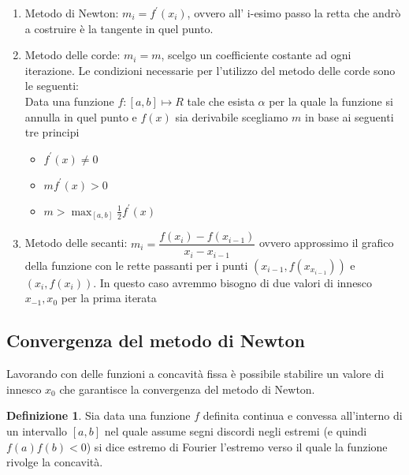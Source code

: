 \documentclass[12pt, a4paper]{book}
\theoremstyle{definition}
\newtheorem{defn}{Definizione}[section]
\begin{document}
\begin{flushleft}
\begin{enumerate}
	\item Metodo di Newton: $m_{i} = f^{'}(x_{i})$,  ovvero all' i-esimo passo la retta che andrò a costruire è la tangente in quel punto. 
	\item Metodo delle corde: $m_{i} = m$,  scelgo un coefficiente costante ad ogni iterazione.  Le condizioni necessarie per l'utilizzo del metodo delle corde sono le seguenti: \\
	Data una funzione $f:[a,b] \mapsto R$ tale che esista $\alpha$ per la quale la funzione si annulla in quel punto e $f(x)$ sia derivabile scegliamo $m$ in base ai seguenti tre principi
	\begin{itemize}
		\item $f^{'}(x) \neq 0$
		\item $mf^{'}(x) > 0$
		\item $m > \max_{[a,b]} \frac{1}{2}f^{'}(x) $
	\end{itemize}
	\item Metodo delle secanti:  $m_{i} = \dfrac{f(x_{i}) - f(x_{i - 1})}{x_{i} - x_{i - 1}}$ ovvero approssimo il grafico della funzione con le rette passanti per i punti $(x_{i-1}, f(x_{x_{i-1}}))$ e $(x_{i}, f(x_{i}))$. In questo caso avremmo bisogno di due valori di innesco $x_{-1}, x_{0}$ per la prima iterata 
\end{enumerate}

\subsection{Convergenza del metodo di Newton}
Lavorando con delle funzioni a concavità fissa è possibile stabilire un valore di innesco $x_{0}$ che garantisce la convergenza del metodo di Newton.
\begin{defn}
Sia data una funzione $f$ definita continua e convessa all'interno di un intervallo $[a,b]$ nel quale assume segni discordi negli estremi (e quindi $f(a)f(b)<0$) si dice estremo di Fourier l'estremo verso il quale la funzione rivolge la concavità.
\end{defn}
\begin{figure}[h!]
    \centering
    \begin{minipage}{0.40\textwidth}
         \centering
\end{minipage}
\end{figure}
\end{flushleft}
\end{document}

